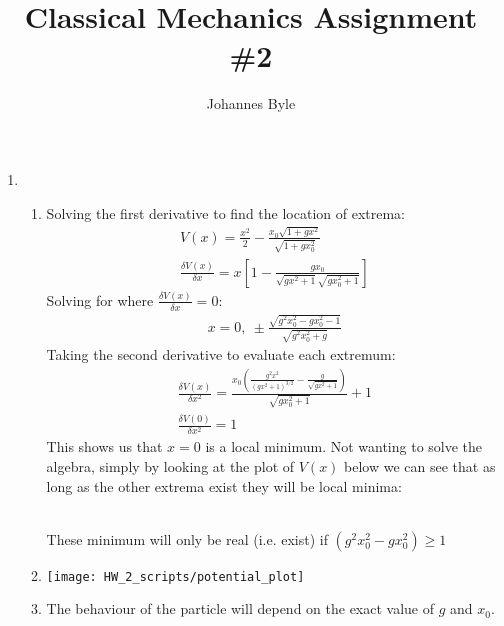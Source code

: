 \documentclass[12pt]{article}
\title{Classical Mechanics Assignment \#2}
\author{Johannes Byle}
\begin{document}
    \maketitle
    \begin{enumerate}
        \item
        \begin{enumerate}
            \item
            Solving the first derivative to find the location of extrema:
            \begin{gather*}
                V(x)=\frac{x^2}{2}-\frac{x_0\sqrt{1+gx^2}}{\sqrt{1+gx_0^2}}\\
                \frac{\delta V(x)}{\delta x}=x\left[1-\frac{gx_0}{\sqrt{gx^2+1}\sqrt{gx_0^2+1}}\right]
            \end{gather*}
            Solving for where $\frac{\delta V(x)}{\delta x}=0$:
            \begin{gather*}
                x=0,\ \pm\frac{\sqrt{g^2 x_0^2-gx_0^2-1}}{\sqrt{g^2 x_0^2+g}}
            \end{gather*}
            Taking the second derivative to evaluate each extremum:
            \begin{gather*}
                \frac{\delta V(x)}{\delta x^2}=\frac{x_0\left(\frac{g^2 x^2}{(gx^2+1)^{3/2}}-\frac{g}{\sqrt{gx^2+1}}\right)}{\sqrt{gx_0^2+1}}+1\\
                \frac{\delta V(0)}{\delta x^2}=1
            \end{gather*}
            This shows us that $x=0$ is a local minimum.
            Not wanting to solve the algebra, simply by looking at the plot of $V(x)$ below we can see that as long as the other extrema exist they will be local minima:\\
            \linebreak
            \\
            These minimum will only be real (i.e. exist) if $(g^2 x_0^2-gx_0^2)\geq 1$\\
            \item
            \texttt{[image: HW\_2\_scripts/potential\_plot]}
            \item The behaviour of the particle will depend on the exact value of $g$ and $x_0$.

\end{enumerate}
\end{enumerate}
\end{document}
